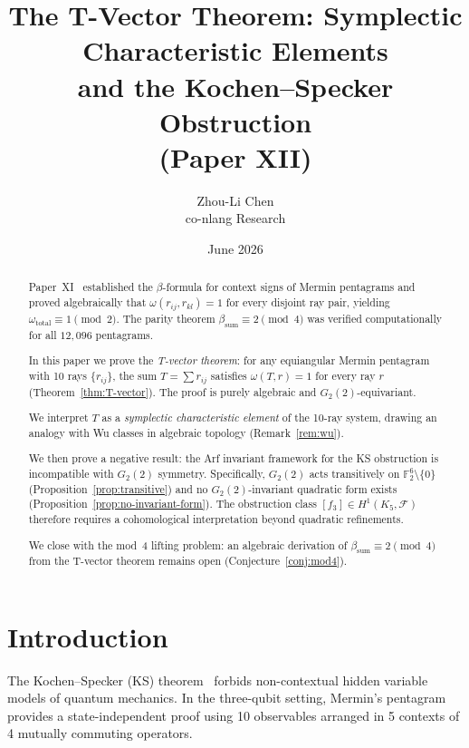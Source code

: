 \documentclass[11pt,a4paper]{article}
\title{The T-Vector Theorem: Symplectic Characteristic Elements\\
       and the Kochen--Specker Obstruction\\
       {\large (Paper XII)}}
\author{Zhou-Li Chen \\ co-nlang Research}
\date{June 2026}
\theoremstyle{remark}
\newcommand{\F}{\mathbb{F}}
\newcommand{\cF}{\mathcal{F}}
\begin{document}
\maketitle

\begin{abstract}
  Paper~XI~\cite{PaperXI} established the $\beta$-formula for context
  signs of Mermin pentagrams and proved algebraically that
  $\omega(r_{ij}, r_{kl}) = 1$ for every disjoint ray pair, yielding
  $\omega_{\text{total}} \equiv 1 \pmod{2}$. The parity theorem
  $\beta_{\text{sum}} \equiv 2 \pmod{4}$ was verified computationally
  for all $12{,}096$ pentagrams.

  In this paper we prove the \emph{T-vector theorem}: for any
  equiangular Mermin pentagram with 10 rays $\{r_{ij}\}$, the sum
  $T = \sum r_{ij}$ satisfies $\omega(T, r) = 1$ for every ray $r$
  (Theorem~\ref{thm:T-vector}). The proof is purely algebraic and
  $G_2(2)$-equivariant.

  We interpret $T$ as a \emph{symplectic characteristic element} of the
  10-ray system, drawing an analogy with Wu classes in algebraic
  topology (Remark~\ref{rem:wu}).

  We then prove a negative result: the Arf invariant framework for the
  KS obstruction is incompatible with $G_2(2)$ symmetry. Specifically,
  $G_2(2)$ acts transitively on $\F_2^6 \setminus \{0\}$
  (Proposition~\ref{prop:transitive}) and no $G_2(2)$-invariant
  quadratic form exists
  (Proposition~\ref{prop:no-invariant-form}). The obstruction class
  $[f_3] \in H^1(K_5, \cF)$ therefore requires a cohomological
  interpretation beyond quadratic refinements.

  We close with the mod~4 lifting problem: an algebraic derivation of
  $\beta_{\text{sum}} \equiv 2 \pmod{4}$ from the T-vector theorem
  remains open (Conjecture~\ref{conj:mod4}).
\end{abstract}

\section{Introduction}
\label{sec:intro}

The Kochen--Specker (KS) theorem~\cite{KochenSpecker1967} forbids
non-contextual hidden variable models of quantum mechanics. In the
three-qubit setting, Mermin's pentagram~\cite{Mermin1990} provides a
state-independent proof using 10 observables arranged in 5 contexts of
4 mutually commuting operators.
\end{document}
